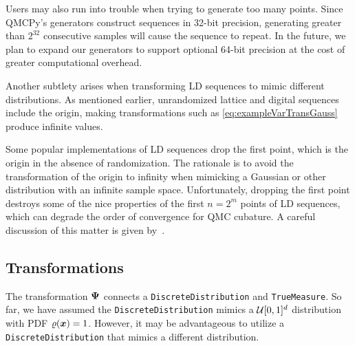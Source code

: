 \documentclass[graybox,footinfo]{svmult}
\begin{document}
Users may also run into trouble when trying to generate too many points. Since QMCPy's generators construct sequences in 32-bit precision, generating greater than $2^{32}$ consecutive samples will cause the sequence to repeat. In the future, we plan to expand our generators to support optional 64-bit precision at the cost of greater computational overhead.

Another subtlety arises when transforming LD sequences to mimic different distributions. As mentioned earlier, unrandomized lattice and digital sequences include the origin, making transformations such as \eqref{eq:exampleVarTransGauss} produce infinite values.  

Some popular implementations of LD sequences drop the first point, which is the origin in the absence of randomization.  The rationale is to avoid the transformation of the origin to infinity when mimicking a Gaussian or other distribution with an infinite sample space.  Unfortunately, dropping the first point destroys some of the nice properties of the first $n = 2^m$ points of LD sequences, which can degrade the order of convergence for QMC cubature. A careful  discussion of this matter is given by~\cite{owen2020dropping}.

\subsection{Transformations}

The transformation ${\boldsymbol{\Psi}}$  connects a \texttt{DiscreteDistribution} and \texttt{TrueMeasure}. So far, we have assumed the \texttt{DiscreteDistribution} mimics a ${\mathcal{U}}[0,1]^d$ distribution with PDF $\varrho({\boldsymbol{x}})=1$. However, it may be advantageous to utilize a \texttt{DiscreteDistribution} that mimics a different distribution. 
\end{document}
